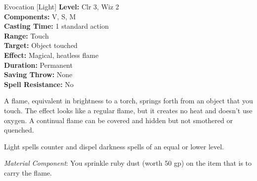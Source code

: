 {Evocation [Light]}
{
	\textbf{Level:}
	Clr 3, Wiz 2\\
	\textbf{Components:}
	V, S, M\\
	\textbf{Casting Time:}
	1 standard action\\
	\textbf{Range:}
	Touch\\
	\textbf{Target:}
	Object touched\\
	\textbf{Effect:}
	Magical, heatless flame\\
	\textbf{Duration:}
	Permanent\\
	\textbf{Saving Throw:}
	None\\
	\textbf{Spell Resistance:}
	No\\
}
{
	A flame, equivalent in brightness to a torch, springs forth from an object that you touch. The effect looks like a regular flame, but it creates no heat and doesn't use oxygen. A continual flame can be covered and hidden but not smothered or quenched.

	Light spells counter and dispel darkness spells of an equal or lower level.

	\textit{Material Component}:
	You sprinkle ruby dust (worth 50 gp) on the item that is to carry the flame.

}
